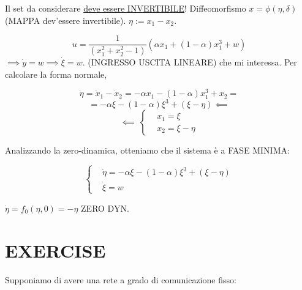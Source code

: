 \begin{itemize}
Il set da considerare \underline{deve essere INVERTIBILE}! Diffeomorfismo $x=\phi(\eta,\delta)$
(MAPPA dev'essere invertibile). $\eta := x_1-x_2$.

\[
	u = \frac{1}{(x_1^2+x_2^2-1)}(\alpha x_1 + (1-\alpha)x_1^3 + w)
\]
$\implies \dot{y}=w \implies \dot{\xi} = w$. (INGRESSO USCITA LINEARE) che mi interessa. Per calcolare la forma normale,

\[
	\dot{\eta} = \dot{x}_1-\dot{x}_2 = -\alpha x_1 - (1-\alpha)x_1^3 + x_2 =
\]
\[
	= -\alpha\xi -(1-\alpha)\xi^3 +(\xi-\eta) \impliedby
\]
\[
	\impliedby\ 
	\left\{
	\begin{aligned}
	&x_1 = \xi\\
	&x_2 = \xi-\eta
	\end{aligned}
	\right.
\]

Analizzando la zero-dinamica, otteniamo che il sistema è a FASE MINIMA:

\[	
	\left\{
	\begin{aligned}
	&\dot{\eta} = -\alpha\xi -(1-\alpha)\xi^3 +(\xi-\eta)\\
	&\dot{\xi} = w
	\end{aligned}
	\right.
\]

$\dot{\eta} = f_0(\eta,0) = -\eta$ ZERO DYN.

\end{itemize}

\section{EXERCISE}

Supponiamo di avere una rete a grado di comunicazione fisso:

